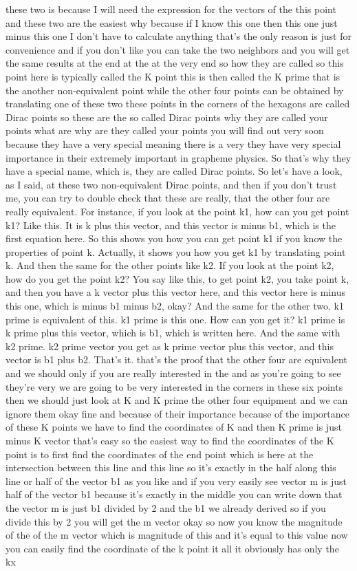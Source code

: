 these two is because I will need the expression for the vectors of the this point and these two are the easiest why because if I know this one then this one just minus this one I don't have to calculate anything that's the only reason is just for convenience and if you don't like you can take the two neighbors and you will get the same results at the end at the at the very end so how they are called so this point here is typically called the K point this is then called the K prime that is the another non-equivalent point while the other four points can be obtained by translating one of these two these points in the corners of the hexagons are called Dirac points so these are the so called Dirac points why they are called your points what are why are they called your points you will find out very soon because they have a very special meaning there is a very they have very special importance in their extremely important in grapheme physics. So that's why they have a special name, which is, they are called Dirac points. So let's have a look, as I said, at these two non-equivalent Dirac points, and then if you don't trust me, you can try to double check that these are really, that the other four are really equivalent. For instance, if you look at the point k1, how can you get point k1? Like this. It is k plus this vector, and this vector is minus b1, which is the first equation here. So this shows you how you can get point k1 if you know the properties of point k. Actually, it shows you how you get k1 by translating point k. And then the same for the other points like k2. If you look at the point k2, how do you get the point k2? You say like this, to get point k2, you take point k, and then you have a k vector plus this vector here, and this vector here is minus this one, which is minus b1 minus b2, okay? And the same for the other two. k1 prime is equivalent of this. k1 prime is this one. How can you get it? k1 prime is k prime plus this vector, which is b1, which is written here. And the same with k2 prime. k2 prime vector you get as k prime vector plus this vector, and this vector is b1 plus b2. That's it. that's the proof that the other four are equivalent and we should only if you are really interested in the and as you're going to see they're very we are going to be very interested in the corners in these six points then we should just look at K and K prime the other four equipment and we can ignore them okay fine and because of their importance because of the importance of these K points we have to find the coordinates of K and then K prime is just minus K vector that's easy so the easiest way to find the coordinates of the K point is to first find the coordinates of the end point which is here at the intersection between this line and this line so it's exactly in the half along this line or half of the vector b1 as you like and if you very easily see vector m is just half of the vector b1 because it's exactly in the middle you can write down that the vector m is just b1 divided by 2 and the b1 we already derived so if you divide this by 2 you will get the m vector okay so now you know the magnitude of the of the m vector which is magnitude of this and it's equal to this value now you can easily find the coordinate of the k point it all it obviously has only the kx 